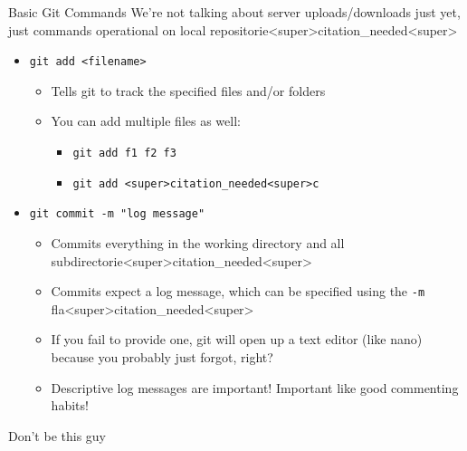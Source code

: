 \documentclass[11pt]{beamer}
\begin{document}
\begin{frame}{Basic Git Commands}
We're not talking about server uploads/downloads just yet, just commands operational on local repositorie<super>citation_needed<super>
\begin{itemize}
\item \texttt{git add <filename>}
\begin{itemize}
\item Tells git to track the specified files and/or folders
\item You can add multiple files as well: 
\begin{itemize}
\item \texttt{git add f1 f2 f3}
\item \texttt{git add <super>citation_needed<super>c}
\end{itemize}
\end{itemize}
\item \texttt{git commit -m "log message"}
\begin{itemize}
\item Commits everything in the working directory and all subdirectorie<super>citation_needed<super>
\item Commits expect a log message, which can be specified using the \texttt{-m} fla<super>citation_needed<super>  
\item If you fail to provide one, git will open up a text editor (like nano) because you probably just forgot, right?
\item Descriptive log messages are important!  Important like good commenting habits!  
\end{itemize}
\end{itemize}
\end{frame}

\begin{frame}{Don't be this guy}
\center
\
\end{frame}
\end{document}
